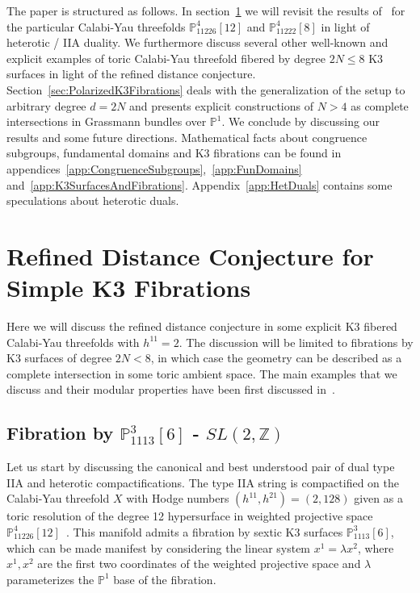 \documentclass[11pt,a4paper]{article}
\numberwithin{equation}{section}
\numberwithin{table}{section}\setlength{\multlinegap}{25pt}
\newcommand{\bbZ}{\mathbb{Z}}
\begin{document}
The paper is structured as follows. In section~\ref{sec:RDC_LowDegree} we will revisit the results of~\cite{Blumenhagen:2018nts} for the particular Calabi-Yau threefolds $\mathbb{P}^4_{11226}[12]$ and $\mathbb{P}^4_{11222}[8]$ in light of heterotic / IIA duality. We furthermore discuss several other well-known and explicit examples of toric Calabi-Yau threefold fibered by degree $2N\leq 8$ K3 surfaces in light of the refined distance conjecture. Section~\ref{sec:PolarizedK3Fibrations} deals with the generalization of the setup to arbitrary degree $d=2N$ and presents explicit constructions of $N>4$ as complete intersections in Grassmann bundles over $\mathbb{P}^1$. We conclude by discussing our results and some future directions. Mathematical facts about congruence subgroups, fundamental domains and K3 fibrations can be found in appendices~\ref{app:CongruenceSubgroups},~\ref{app:FunDomains} and~\ref{app:K3SurfacesAndFibrations}. Appendix~\ref{app:HetDuals} contains some speculations about heterotic duals.

\section{Refined Distance Conjecture for Simple K3 Fibrations}
\label{sec:RDC_LowDegree}

Here we will discuss the refined distance conjecture in some explicit K3 fibered Calabi-Yau threefolds with $h^{11}=2$. The discussion will be limited to fibrations by K3 surfaces of degree $2N<8$, in which case the geometry can be described as a complete intersection in some toric ambient space. The main examples that we discuss and their modular properties have been first discussed in~\cite{Klemm:1995tj}.

\subsection{Fibration by \texorpdfstring{$\mathbb{P}^3_{1113}[6]$}{sextic K3} - \texorpdfstring{$SL(2,\bbZ)$}{SL(2)}}
\label{subsec:11226}

Let us start by discussing the canonical and best understood pair of dual type IIA and heterotic compactifications. The type IIA string is compactified on the Calabi-Yau threefold $X$ with Hodge numbers $(h^{11},h^{21})=(2,128)$ given as a toric resolution of the degree 12 hypersurface in weighted projective space $\mathbb{P}^4_{11226}[12]$~\cite{Candelas:1993dm}. This manifold admits a fibration by sextic K3 surfaces $\mathbb{P}^3_{1113}[6]$, which can be made manifest by considering the linear system $x^1=\lambda x^2$, where $x^1,x^2$ are the first two coordinates of the weighted projective space and $\lambda$ parameterizes the $\mathbb{P}^1$ base of the fibration.
\end{document}
